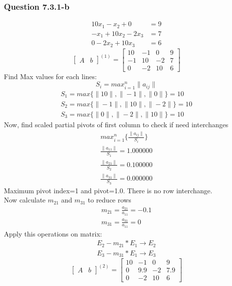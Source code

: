 \documentclass{article}
\begin{document}
\subsubsection{Question 7.3.1-b}
\begin{align}
\label{q7.3.1.b.1}10x_{1}-x_{2}+0&=9 \\
\label{q7.3.1.b.2}-x_{1}+10x_{2}-2x_{3}&=7 \\
\label{q7.3.1.b.3}0-2x_{2}+10x_{3}&=6
\end{align}
\[
\left[
\begin{array}{c|c}
A&b
\end{array}
\right]^{(1)}
=
\left[
\begin{array}{ccc|c}
	10&-1&0&9\\
	-1&10&-2&7\\
	0&-2&10&6 
\end{array}
\right]
\]
Find Max values for each lines: 
\begin{equation}
\label{findSMax3}S_{i}=max_{i=1}^n\|a_{ij}\|
\end{equation}
\begin{align}
	S_{1}=max\{\|10\|,\|-1\|,\|0\|\}=10\\
	S_{2}=max\{\|-1\|,\|10\|,\|-2\|\}=10\\
	S_{3}=max\{\|0\|,\|-2\|,\|10\|\}=10
\end{align}
Now, find scaled partial pivots of first column to check if need interchanges
\begin{align}
	max_{i=1}^n\{\frac{\|a_{ij}\|}{S_{i}}\}\\
	\frac{\|a_{11}\|}{S_{1}}=1.000000\\
	\frac{\|a_{21}\|}{S_{2}}=0.100000\\
	\frac{\|a_{31}\|}{S_{3}}=0.000000
\end{align}
Maximum pivot index=1 and pivot=1.0. There is no row interchange.\\
Now calculate $m_{21}$ and $m_{31}$ to reduce rows 
\begin{align}
	m_{21}=\frac{a_{21}}{a_{11}}=-0.1\\
	m_{31}=\frac{a_{31}}{a_{11}}=0
\end{align}
Apply this operations on matrix:
\begin{align}
	E_{2}-m_{21}*E_{1}\rightarrow E_{2}\\
	E_{3}-m_{31}*E_{1}\rightarrow E_{3}
\end{align}
\[
\left[
\begin{array}{c|c}
A&b
\end{array}
\right]^{(2)}
=
\left[
\begin{array}{ccc|c}
	10&-1&0&9\\
	0&9.9&-2&7.9\\
	0&-2&10&6 
\end{array}
\right]
\]
\end{document}
